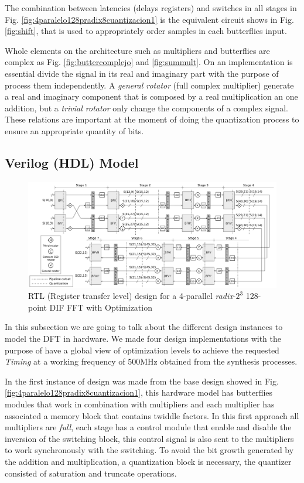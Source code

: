 \documentclass[journal,comsoc]{IEEEtran}
\begin{document}
The combination between latencies (delays registers) and switches in all stages in Fig. \ref{fig:4paralelo128pradix8cuantizacion1} is the equivalent circuit shows in Fig. \ref{fig:shift}, that is used to appropriately order samples in each butterflies input.

Whole elements on the architecture such as multipliers and butterflies are complex as Fig. \ref{fig:buttercomplejo} and \ref{fig:summult}. On an implementation is essential divide the signal in its real and imaginary part with the purpose of process them independently. A \textit{general rotator} (full complex multiplier) generate a real and imaginary component that is composed by a real multiplication an one addition, but a \textit{trivial rotator} only change the components of a complex signal. These relations are important at the moment of doing the quantization process to ensure an appropriate quantity of bits.
\subsection{Verilog (HDL) Model} 
\begin{figure}[t!]
	\centering
	\includegraphics[width=\linewidth]{Diagramas/folding-128-quant-pipe.png}
	\caption{RTL (Register transfer level) design for a 4-parallel \textit{radix}-$2^3$ 128-point DIF FFT with Optimization}
	\label{fig:v5esquemap}
\end{figure}

In this subsection we are going to talk about the different design instances to model the DFT in hardware. 
We made four design implementations with the purpose of have a global view of optimization levels to achieve the requested \textit{Timing} at a working frequency of 500MHz obtained from the synthesis processes.

In the first instance of design was made from the base design showed in Fig. \ref{fig:4paralelo128pradix8cuantizacion1}, this hardware model has butterflies modules that work in combination with multipliers and each multiplier has associated a memory block that contains twiddle factors. In this first approach all multipliers are \textit{full}, each stage has a control module that enable and disable the inversion of the switching block, this control signal is also sent to the multipliers to work synchronously with the switching. To avoid the bit growth generated by the addition and multiplication, a quantization block is necessary, the quantizer consisted of saturation and truncate operations.
\end{document}
